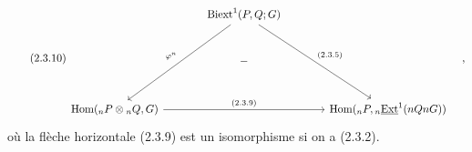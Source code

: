 \begin{equation}\tag{2.3.10}
\begin{tikzcd}[column sep=large, row sep=large]
 & \mathrm{Biext}^1(P,Q;G) \arrow[ddl, "\varphi^n"'] \arrow[ddr, "(2.3.5)"] & \\
 & - & \\
\mathrm{Hom}({}_nP\otimes{}_nQ,G) \arrow[rr, "(2.3.9)"] & & \mathrm{Hom}({}_nP,{}_n\underline{\mathrm{Ext}}^1(nQnG))
\end{tikzcd}\quad ,
\end{equation}
où la flèche horizontale (2.3.9) est un isomorphisme si on a (2.3.2).

